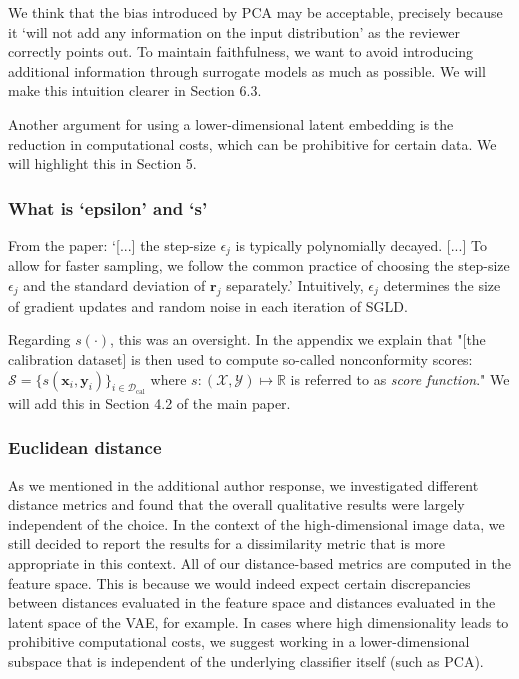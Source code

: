 \documentclass[letterpaper]{article} %
\begin{document}
We think that the bias introduced by PCA may be acceptable, precisely because it `will not add any information on the input distribution' as the reviewer correctly points out. To maintain faithfulness, we want to avoid introducing additional information through surrogate models as much as possible. We will make this intuition clearer in Section 6.3.

Another argument for using a lower-dimensional latent embedding is the reduction in computational costs, which can be prohibitive for certain data. We will highlight this in Section 5. 

\subsubsection{What is `epsilon' and `s'}

From the paper: `[...] the step-size $\epsilon_j$ is typically polynomially decayed. [...] To allow for faster sampling, we follow the common practice of choosing the step-size $\epsilon_j$ and the standard deviation of $\mathbf{r}_j$ separately.' Intuitively, $\epsilon_j$ determines the size of gradient updates and random noise in each iteration of SGLD.

Regarding $s(\cdot)$, this was an oversight. In the appendix we explain that "[the calibration dataset] is then used to compute so-called nonconformity scores: $\mathcal{S}=\{s(\mathbf{x}_i,\mathbf{y}_i)\}_{i \in \mathcal{D}_{\text{cal}}}$ where $s: (\mathcal{X},\mathcal{Y}) \mapsto \mathbb{R}$ is referred to as \textit{score function}." We will add this in Section 4.2 of the main paper. 

\subsubsection{Euclidean distance}

As we mentioned in the additional author response, we investigated different distance metrics and found that the overall qualitative results were largely independent of the choice. In the context of the high-dimensional image data, we still decided to report the results for a dissimilarity metric that is more appropriate in this context. All of our distance-based metrics are computed in the feature space. This is because we would indeed expect certain discrepancies between distances evaluated in the feature space and distances evaluated in the latent space of the VAE, for example. In cases where high dimensionality leads to prohibitive computational costs, we suggest working in a lower-dimensional subspace that is independent of the underlying classifier itself (such as PCA).
\end{document}
